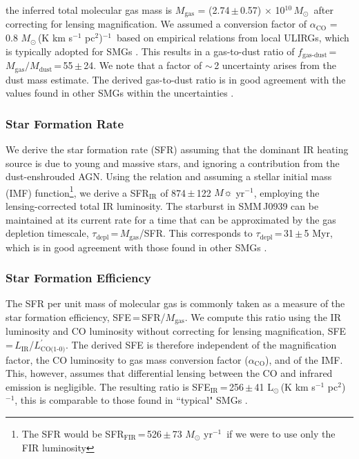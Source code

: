 \documentclass[twocolumn,apj,numberedappendix]{emulateapj}
\newcommand{\Msun}{\mbox{$M_{\odot}$}}
\newcommand{\Lsun}{\mbox{L$_{\odot}$}}
\newcommand{\Lp}{\mbox{$L^{\prime}_\textrm{CO(1-0)}$}}
\newcommand{\LpU}{\mbox{K\,\,km\,\,s$^{-1}$\,\,pc$^2$}}
\newcommand{\eg}{{\sl e.g.,~}}
\newcommand{\pmOne}{\mbox{$^{-1}$}}
\begin{document}
the inferred total molecular gas mass is $M_\textrm{gas}$ = (2.74\,$\pm$\,0.57) $\times$\,\,10$^{10}$\,\Msun\, after correcting for lensing magnification. We assumed a conversion factor of $\alpha_\textrm{CO}$ = 0.8\,\,\Msun\,(\LpU)\pmOne\ based on empirical relations from local ULIRGs, which is typically
adopted for SMGs \citep[\eg][]{Tacconi06a,Tacconi08a,Bothwell13a}.
This results in a gas-to-dust
ratio of $f_\textrm{gas-dust}$\,=\,$M_\textrm{gas}/M_\textrm{dust}$\,=\,55\,$\pm$\,24. We note that a factor of $\sim$\,2 uncertainty arises from the dust mass estimate. The derived gas-to-dust ratio is in good agreement with the
values found in other SMGs within the uncertainties \citep{Coppin08a,Micha10a,Riechers11c}.

\subsubsection{Star Formation Rate}
We derive the star formation rate (SFR) assuming that the dominant IR heating source is due to young and massive stars, and ignoring a contribution from the
dust-enshrouded AGN.
Using the \citet{Kennicutt98a} relation and assuming a \citet{Chabrier03a}
stellar initial mass (IMF) function\footnote{The SFR would be SFR$_\textrm{FIR}$\,=\,526\,$\pm$\,73 $M_
\odot$ yr\pmOne\ if we were to use only the FIR luminosity},
we derive a SFR$_\textrm{IR}$ of 874\,$\pm$\,122 $M\sun$\,\,yr\pmOne, employing the lensing-corrected total IR luminosity.
The starburst in SMM\,J0939 can be maintained at its
current rate for a time that can be approximated by the gas depletion timescale, $\tau_\textrm{depl}$\,=\,$M_\textrm{gas}$/SFR.
This corresponds to $\tau_\textrm{depl}$\,=\,31\,$\pm$\,5 Myr, which is in good agreement with those found in other SMGs \citep[\eg][]{Greve05a}.

\subsubsection{Star Formation Efficiency}
The SFR per unit mass of molecular gas is commonly taken as a
measure of the star formation efficiency, SFE\,=\,SFR/$M_\textrm{gas}$. We compute this ratio using the IR
luminosity and CO luminosity without correcting for lensing magnification, SFE\,=\,$L_\textrm{IR}$/\Lp. The derived SFE is therefore independent of the magnification factor, the CO luminosity to gas mass conversion factor ($\alpha_\textrm{CO}$), and of the
IMF. This, however, assumes that differential lensing between the CO and infrared emission is negligible.
The resulting ratio is SFE$_\textrm{IR}$\,=\,256\,$\pm$\,41\,\,\Lsun\,(\LpU)$^{-1}$, this is comparable
to those found in ``typical" SMGs \citep{Greve05a,Tacconi06a,Riechers11c}.
\end{document}

